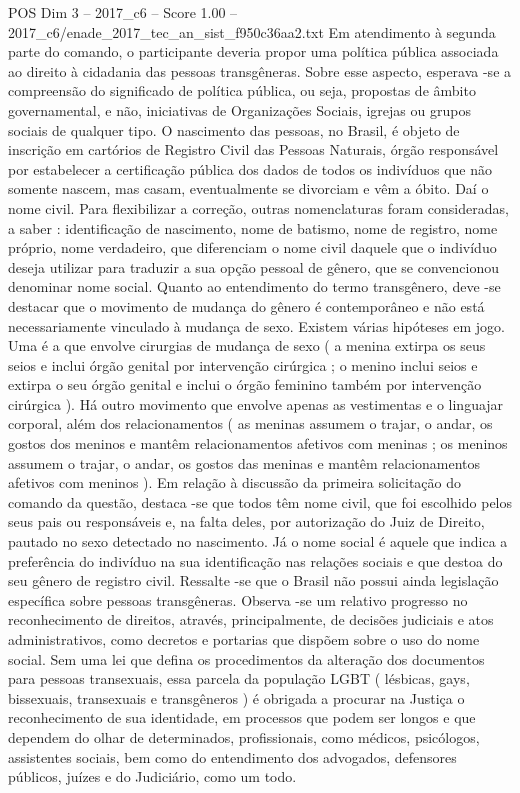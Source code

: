 \begin{textsample}{POS Dim 3 – 2017\_c6 – Score 1.00 – 2017\_c6/enade\_2017\_tec\_an\_sist\_f950c36aa2.txt}
Em atendimento à segunda parte do comando, o participante deveria propor uma política pública associada ao direito à cidadania das pessoas transgêneras.
Sobre esse aspecto, esperava -se a compreensão do significado de política pública, ou seja, propostas de âmbito governamental, e não, iniciativas de Organizações Sociais, igrejas ou grupos sociais de qualquer tipo.
O nascimento das pessoas, no Brasil, é objeto de inscrição em cartórios de Registro Civil das Pessoas Naturais, órgão responsável por estabelecer a certificação pública dos dados de todos os indivíduos que não somente nascem, mas casam, eventualmente se divorciam e vêm a óbito.
Daí o nome civil.
Para flexibilizar a correção, outras nomenclaturas foram consideradas, a saber : identificação de nascimento, nome de batismo, nome de registro, nome próprio, nome verdadeiro, que diferenciam o nome civil daquele que o indivíduo deseja utilizar para traduzir a sua opção pessoal de gênero, que se convencionou denominar nome social.
Quanto ao entendimento do termo transgênero, deve -se destacar que o movimento de mudança do gênero é contemporâneo e não está necessariamente vinculado à mudança de sexo.
Existem várias hipóteses em jogo.
Uma é a que envolve cirurgias de mudança de sexo ( a menina extirpa os seus seios e inclui órgão genital por intervenção cirúrgica ; o menino inclui seios e extirpa o seu órgão genital e inclui o órgão feminino também por intervenção cirúrgica ).
Há outro movimento que envolve apenas as vestimentas e o linguajar corporal, além dos relacionamentos ( as meninas assumem o trajar, o andar, os gostos dos meninos e mantêm relacionamentos afetivos com meninas ; os meninos assumem o trajar, o andar, os gostos das meninas e mantêm relacionamentos afetivos com meninos ).
Em relação à discussão da primeira solicitação do comando da questão, destaca -se que todos têm nome civil, que foi escolhido pelos seus pais ou responsáveis e, na falta deles, por autorização do Juiz de Direito, pautado no sexo detectado no nascimento.
Já o nome social é aquele que indica a preferência do indivíduo na sua identificação nas relações sociais e que destoa do seu gênero de registro civil.
Ressalte -se que o Brasil não possui ainda legislação específica sobre pessoas transgêneras.
Observa -se um relativo progresso no reconhecimento de direitos, através, principalmente, de decisões judiciais e atos administrativos, como decretos e portarias que dispõem sobre o uso do nome social.
Sem uma lei que defina os procedimentos da alteração dos documentos para pessoas transexuais, essa parcela da população LGBT ( lésbicas, gays, bissexuais, transexuais e transgêneros ) é obrigada a procurar na Justiça o reconhecimento de sua identidade, em processos que podem ser longos e que dependem do olhar de determinados, profissionais, como médicos, psicólogos, assistentes sociais, bem como do entendimento dos advogados, defensores públicos, juízes e do Judiciário, como um todo.

\end{textsample}
